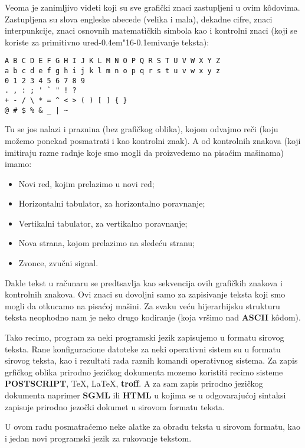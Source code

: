 \documentclass[12pt,a4paper,titlepage]{article}
\def\d{d\kern-0.4em\char"16\kern-0.1em}
\begin{document}
    Veoma je zanimljivo videti koji su sve grafi\v cki znaci zastupljeni u
    ovim k\^odovima.
    Zastupljena su slova engleske abecede (velika i mala), dekadne cifre,
    znaci interpunkcije, znaci osnovnih matemati\v ckih simbola kao i
    kontrolni znaci (koji se koriste za primitivno ure\d ivanje teksta):
    \begin{verbatim}
A B C D E F G H I J K L M N O P Q R S T U V W X Y Z
a b c d e f g h i j k l m n o p q r s t u v w x y z
0 1 2 3 4 5 6 7 8 9
. , : ; ' ` " ! ?
+ - / \ * = ^ < > ( ) [ ] { }
@ # $ % & _ | ~
\end{verbatim}
    Tu se jos nalazi i praznina (bez grafi\v ckog oblika), kojom odvajmo
    re\v ci (koju mo\v zemo ponekad posmatrati i kao kontrolni znak).
    A od kontrolnih znakova (koji imitiraju razne radnje koje smo mogli da
    proizvedemo na pisa\'cim ma\v sinama) imamo:
    \begin{itemize}
    \item
      Novi red, kojim prelazimo u novi red;
    \item
      Horizontalni tabulator, za horizontalno poravnanje;
    \item
      Vertikalni tabulator, za vertikalno poravnanje;
    \item
      Nova strana, kojom prelazimo na slede\'cu stranu;
    \item
      Zvonce, zvu\v cni signal.
    \end{itemize}

    Dakle tekst u ra\v cunaru se predtsavlja kao sekvencija ovih grafi\v ckih
    znakova i kontrolnih znakova.
    Ovi znaci su dovoljni samo za zapisivanje teksta koji smo mogli da
    otkucamo na pisa\'coj ma\v sini.
    Za svaku ve\'cu hijerarhijsku strukturu teksta neophodno nam je neko drugo
    kodiranje (koja vr\v simo nad {\bf ASCII} k\^odom).

    Tako recimo, program za neki programski jezik zapisujemo u formatu
    sirovog teksta. Rane konfiguracione datoteke za neki operativni sistem
    su u formatu sirovog teksta, kao i rezultati rada raznih komandi
    operativnog sistema. Za zapis grfi\v ckog oblika prirodno jezi\v ckog
    dokumenta mozemo koristiti recimo sisteme {\bf POSTSCRIPT}, {\TeX},
    {\LaTeX}, {\bf troff}. A za sam zapis prirodno jezi\v ckog dokumenta
    naprimer {\bf SGML} ili {\bf HTML} u kojima se u odgovaraju\'coj sintaksi
    zapisuje prirodno jezo\v cki dokumet u sirovom formatu teksta.

    U ovom radu posmatra\'cemo neke alatke za obradu teksta u sirovom
    formatu, kao i jedan novi programski jezik za rukovanje tekstom.
%
%
  \newpage
\end{document}
